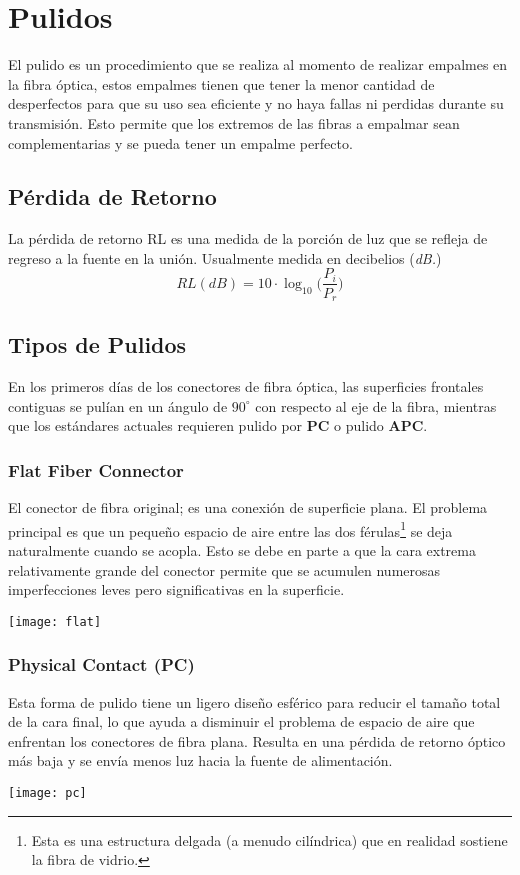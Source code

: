 \section{Pulidos}
El pulido es un procedimiento que se realiza al momento de realizar empalmes en la fibra óptica, estos empalmes tienen que tener la menor cantidad de desperfectos para que su uso sea eficiente y no haya fallas ni perdidas durante su transmisión. Esto permite que los extremos de las fibras a empalmar sean complementarias y se pueda tener un empalme perfecto.
\subsection{Pérdida de Retorno}
La pérdida de retorno RL es una medida de la porción de luz que se refleja de regreso a la fuente en la unión. Usualmente medida en decibelios (\textit{dB.})
$$
RL(dB)= 10\cdot \log_{10} \Bigg(\dfrac{P_i}{P_r}\Bigg)
$$
\subsection{Tipos de Pulidos}
En los primeros días de los conectores de fibra óptica, las superficies frontales contiguas se pulían en un ángulo de $90^{\circ}$ con respecto al eje de la fibra, mientras que los estándares actuales requieren pulido por \textbf{PC} o pulido \textbf{APC}.

\subsubsection*{Flat Fiber Connector}
El conector de fibra original; es una conexión de superficie plana. El problema principal es que un pequeño espacio de aire entre las dos férulas\footnote{Esta es una estructura delgada (a menudo cilíndrica) que en realidad sostiene la fibra de vidrio.} se deja naturalmente cuando se acopla. Esto se debe en parte a que la cara extrema relativamente grande del conector permite que se acumulen numerosas imperfecciones leves pero significativas en la superficie.
\begin{center}
\texttt{[image: flat]}
\end{center}
\subsubsection*{Physical Contact (PC)}
Esta forma de pulido tiene un ligero diseño esférico para reducir el tamaño total de la cara final, lo que ayuda a disminuir el problema de espacio de aire que enfrentan los conectores de fibra plana. Resulta en una pérdida de retorno óptico más baja y se envía menos luz hacia la fuente de alimentación.
\begin{center}
\texttt{[image: pc]}
\end{center}
